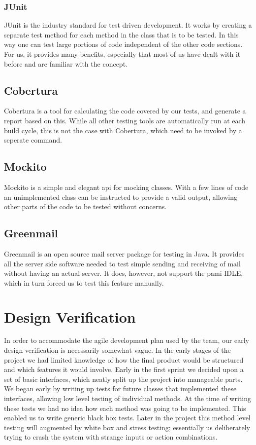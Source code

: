 \subsubsection{JUnit}
JUnit is the industry standard for test driven development. It works by creating a separate test method for each method in the class that is to be tested. In this way one can test large portions of code independent of the other code sections. For us, it provides many benefits, especially that most of us have dealt with it before and are familiar with the concept.

\subsection{Cobertura}
Cobertura is a tool for calculating the code covered by our tests, and generate a report based on this. While all other testing tools are automatically run at each build cycle, this is not the case with
Cobertura, which need to be invoked by a seperate command. 

\subsection{Mockito}
Mockito is a simple and elegant \gls{api} for mocking classes. With a few lines of code an unimplemented class can be instructed to provide a valid output, allowing other parts of the code to be tested without concerns.

\subsection{Greenmail}
Greenmail is an open source mail server package for testing in Java. It provides all the server side software needed to test simple sending and receiving of mail without having an actual server. 
It does, however, not support the \gls{pami} IDLE, which in turn forced us to test this feature manually.

\section{Design Verification}
In order to accommodate the agile development plan used by the team, our early design verification is necessarily somewhat vague. In the early stages of the project we had limited knowledge of how the final product would be structured and which features it would involve.
\newline
\newline
Early in the first sprint we decided upon a set of basic interfaces, which neatly split up the project into manageable parts. We began early by writing up tests for future classes that implemented these interfaces, allowing low level testing of individual methods. At the time of writing these tests we had no idea how each method was going to be implemented. This enabled us to write generic black box tests.
\newline
\newline
Later in the project this method level testing will augmented by white box and stress testing; essentially us deliberately trying to crash the system with strange inputs or action combinations. 

